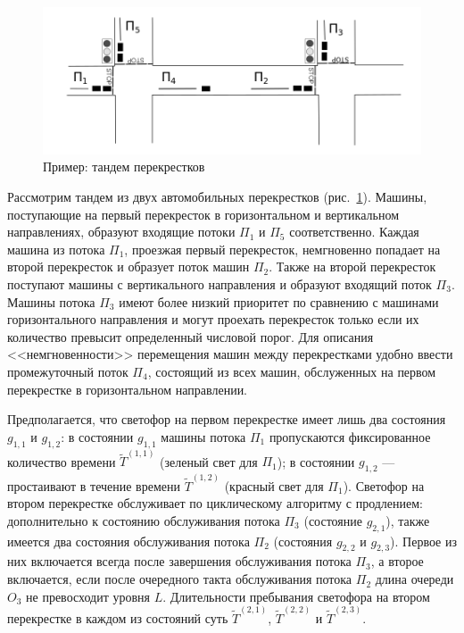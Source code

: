 \documentclass[11pt]{ubs}
\begin{document}
\begin{figure}[t]
\centering
\includegraphics[scale=0.35]{Crossroads_grayscale.png}
\caption{Пример: тандем перекрестков}
\label{crossroads}
\end{figure}
Рассмотрим тандем из двух автомобильных перекрестков (рис.~\ref{crossroads}).
Машины, поступающие на первый перекресток в горизонтальном и вертикальном направлениях, образуют входящие потоки $\Pi_1$ и $\Pi_5$ соответственно. Каждая машина из потока $\Pi_1$, проезжая первый перекресток, немгновенно попадает на второй перекресток и образует поток машин $\Pi_2$. Также на второй перекресток поступают машины с вертикального направления и образуют входящий поток $\Pi_3$. Машины потока $\Pi_3$ имеют более низкий приоритет по сравнению с машинами горизонтального направления и могут проехать перекресток только если их количество превысит определенный числовой порог.
Для описания <<немгновенности>> перемещения машин между перекрестками удобно ввести промежуточный поток $\Pi_4$, состоящий из всех машин, обслуженных на первом перекрестке в горизонтальном направлении. 

Предполагается, что светофор на первом перекрестке имеет лишь два состояния $g_{1,1}$ и $g_{1,2}$: в состоянии $g_{1,1}$ машины потока $\Pi_1$ пропускаются фиксированное количество времени $\widetilde T^{(1,1)}$ (зеленый свет для $\Pi_1$); в состоянии $g_{1,2}$ --- простаивают в течение времени $\widetilde T^{(1,2)}$ (красный свет для $\Pi_1$). Светофор на втором перекрестке обслуживает по циклическому алгоритму с продлением: дополнительно к состоянию обслуживания потока $\Pi_3$ (состояние $g_{2,1}$), также имеется два состояния обслуживания потока $\Pi_2$ (состояния $g_{2,2}$ и $g_{2,3}$). Первое из них включается всегда после завершения обслуживания потока $\Pi_3$, а второе включается, если после очередного такта обслуживания потока $\Pi_2$ длина очереди $O_3$ не превосходит уровня $L$.
Длительности пребывания светофора на втором перекрестке в каждом из состояний суть $\widetilde T^{(2,1)}$, $\widetilde T^{(2,2)}$ и $\widetilde T^{(2,3)}$.
\end{document}
